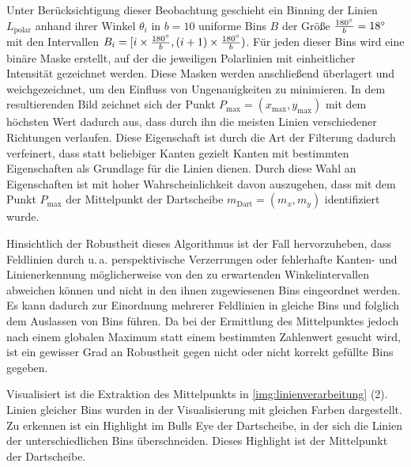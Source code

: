 Unter Berücksichtigung dieser Beobachtung geschieht ein Binning der Linien $L_\text{polar}$ anhand ihrer Winkel $\theta_i$ in $b=10$ uniforme Bins $B$ der Größe $\frac{180^{\circ}}{b}=18^{\circ}$ mit den Intervallen $ B_i = [i \times \frac{180^{\circ}}{b}, (i+1) \times \frac{180^{\circ}}{b})$. Für jeden dieser Bins wird eine binäre Maske erstellt, auf der die jeweiligen Polarlinien mit einheitlicher Intensität gezeichnet werden. Diese Masken werden anschließend überlagert und weichgezeichnet, um den Einfluss von Ungenauigkeiten zu minimieren. In dem resultierenden Bild zeichnet sich der Punkt $P_\text{max} = (x_\text{max}, y_\text{max})$ mit dem höchsten Wert dadurch aus, dass durch ihn die meisten Linien verschiedener Richtungen verlaufen. Diese Eigenschaft ist durch die Art der Filterung dadurch verfeinert, dass statt beliebiger Kanten gezielt Kanten mit bestimmten Eigenschaften als Grundlage für die Linien dienen. Durch diese Wahl an Eigenschaften ist mit hoher Wahrscheinlichkeit davon auszugehen, dass mit dem Punkt $P_\text{max}$ der Mittelpunkt der Dartscheibe $m_\text{Dart}=(m_x, m_y)$ identifiziert wurde.

Hinsichtlich der Robustheit dieses Algorithmus ist der Fall hervorzuheben, dass Feldlinien durch u.\,a. perspektivische Verzerrungen oder fehlerhafte Kanten- und Linienerkennung möglicherweise von den zu erwartenden Winkelintervallen abweichen können und nicht in den ihnen zugewiesenen Bins eingeordnet werden. Es kann dadurch zur Einordnung mehrerer Feldlinien in gleiche Bins und folglich dem Auslassen von Bins führen. Da bei der Ermittlung des Mittelpunktes jedoch nach einem globalen Maximum statt einem bestimmten Zahlenwert gesucht wird, ist ein gewisser Grad an Robustheit gegen nicht oder nicht korrekt gefüllte Bins gegeben.

Visualisiert ist die Extraktion des Mittelpunkts in \autoref{img:linienverarbeitung} (2). Linien gleicher Bins wurden in der Visualisierung mit gleichen Farben dargestellt. Zu erkennen ist ein Highlight im Bulls Eye der Dartscheibe, in der sich die Linien der unterschiedlichen Bins überschneiden. Dieses Highlight ist der Mittelpunkt der Dartscheibe.


